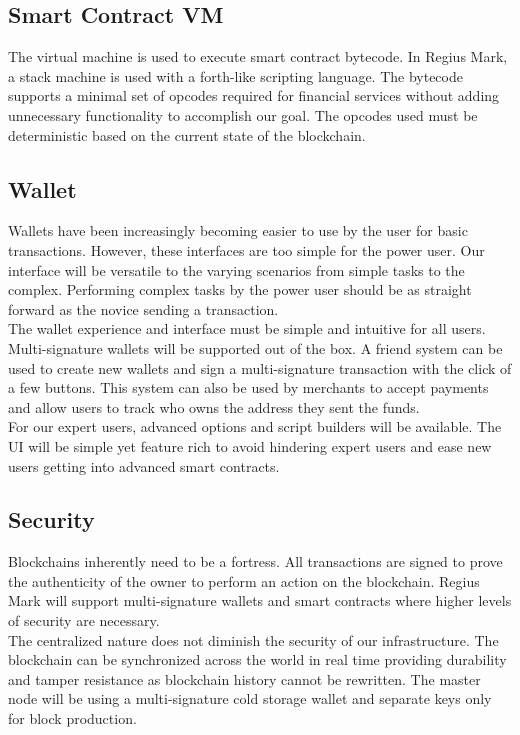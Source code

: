 \documentclass[12pt,a4paper]{article}
\begin{document}
  \subsection{Smart Contract VM}
  The virtual machine is used to execute smart contract bytecode. In Regius
  Mark, a stack machine is used with a forth-like scripting language. The
  bytecode supports a minimal set of opcodes required for financial services
  without adding unnecessary functionality to accomplish our goal. The opcodes
  used must be deterministic based on the current state of the blockchain.

  \subsection{Wallet}
  Wallets have been increasingly becoming easier to use by the user for
  basic transactions. However, these interfaces are too simple for the power
  user. Our interface will be versatile to the varying scenarios from simple
  tasks to the complex. Performing complex tasks by the power user should be as
  straight forward as the novice sending a transaction.\\

  The wallet experience and interface must be simple and intuitive for all
  users. Multi-signature wallets will be supported out of the box. A friend
  system can be used to create new wallets and sign a multi-signature
  transaction with the click of a few buttons. This system can also be used by
  merchants to accept payments and allow users to track who owns the address
  they sent the funds.\\

  For our expert users, advanced options and script builders will be available.
  The UI will be simple yet feature rich to avoid hindering expert users and
  ease new users getting into advanced smart contracts.

  \subsection{Security}
  Blockchains inherently need to be a fortress. All transactions are signed to
  prove the authenticity of the owner to perform an action on the blockchain.
  Regius Mark will support multi-signature wallets and smart contracts where
  higher levels of security are necessary.\\

  \newpage
  The centralized nature does not diminish the security of our infrastructure.
  The blockchain can be synchronized across the world in real time providing
  durability and tamper resistance as blockchain history cannot be rewritten.
  The master node will be using a multi-signature cold storage wallet and
  separate keys only for block production.
\end{document}
